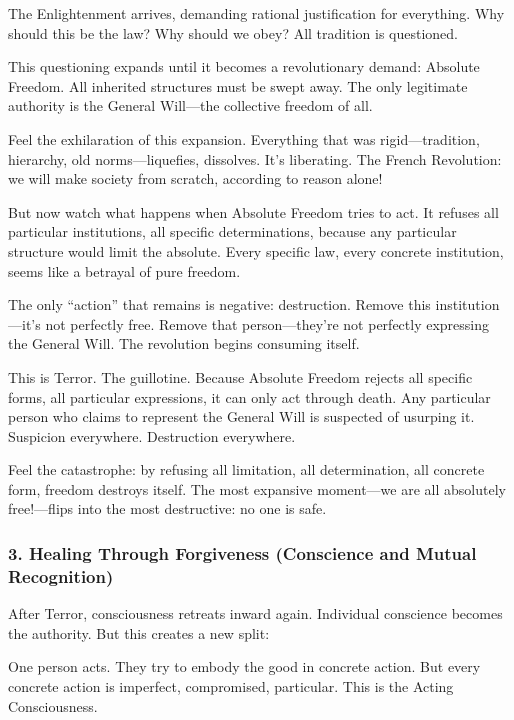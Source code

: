 The Enlightenment arrives, demanding rational justification for everything. Why should this be the law? Why should we obey? All tradition is questioned.

This questioning expands until it becomes a revolutionary demand: Absolute Freedom. All inherited structures must be swept away. The only legitimate authority is the General Will---the collective freedom of all.

Feel the exhilaration of this expansion. Everything that was rigid---tradition, hierarchy, old norms---liquefies, dissolves. It's liberating. The French Revolution: we will make society from scratch, according to reason alone!

But now watch what happens when Absolute Freedom tries to act. It refuses all particular institutions, all specific determinations, because any particular structure would limit the absolute. Every specific law, every concrete institution, seems like a betrayal of pure freedom.

The only ``action'' that remains is negative: destruction. Remove this institution---it's not perfectly free. Remove that person---they're not perfectly expressing the General Will. The revolution begins consuming itself.

This is Terror. The guillotine. Because Absolute Freedom rejects all specific forms, all particular expressions, it can only act through death. Any particular person who claims to represent the General Will is suspected of usurping it. Suspicion everywhere. Destruction everywhere.

Feel the catastrophe: by refusing all limitation, all determination, all concrete form, freedom destroys itself. The most expansive moment---we are all absolutely free!---flips into the most destructive: no one is safe.

\subsubsection{3. Healing Through Forgiveness (Conscience and Mutual Recognition)}\label{healing-through-forgiveness-conscience-and-mutual-recognition}

After Terror, consciousness retreats inward again. Individual conscience becomes the authority. But this creates a new split:

One person acts. They try to embody the good in concrete action. But every concrete action is imperfect, compromised, particular. This is the Acting Consciousness.

